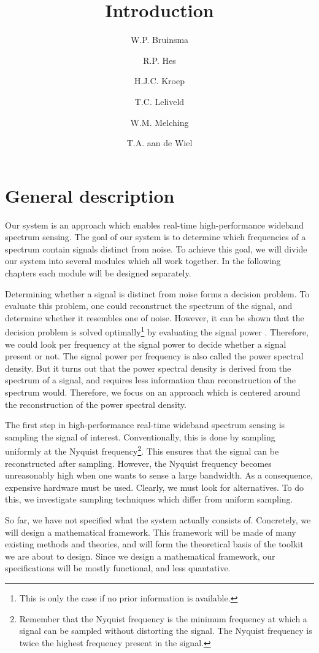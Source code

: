 \documentclass[a4paper, openany, oneside]{memoir}
\title{Introduction}
\author{W.P. Bruinsma \and R.P. Hes \and H.J.C. Kroep \and T.C. Leliveld \and W.M. Melching \and T.A. aan de Wiel}
\begin{document}
\section{General description}
Our system is an approach which enables real-time high-performance wideband spectrum sensing. The goal of our system is to determine which frequencies of a spectrum contain signals distinct from noise. To achieve this goal, we will divide our system into several modules which all work together. In the following chapters each module will be designed separately.

Determining whether a signal is distinct from noise forms a decision problem. To evaluate this problem, one could reconstruct the spectrum of the signal, and determine whether it resembles one of noise. However, it can be shown that the decision problem is solved optimally\footnote{This is only the case if no prior information is available.} by evaluating the signal power \cite{axell2012spectrum}. Therefore, we could look per frequency at the signal power to decide whether a signal present or not. The signal power per frequency is also called the power spectral density. But it turns out that the power spectral density is derived from the spectrum of a signal, and requires less information than reconstruction of the spectrum would. Therefore, we focus on an approach which is centered around the reconstruction of the power spectral density.

The first step in high-performance real-time wideband spectrum sensing is sampling the signal of interest. Conventionally, this is done by sampling uniformly at the Nyquist frequency\footnote{Remember that the Nyquist frequency is the minimum frequency at which a signal can be sampled without distorting the signal. The Nyquist frequency is twice the highest frequency present in the signal.}. This ensures that the signal can be reconstructed after sampling. However, the Nyquist frequency becomes unreasonably high when one wants to sense a large bandwidth. As a consequence, expensive hardware must be used. Clearly, we must look for alternatives. To do this, we investigate sampling techniques which differ from uniform sampling.

So far, we have not specified what the system actually consists of. Concretely, we will design a mathematical framework. This framework will be made of many existing methods and theories, and will form the theoretical basis of the toolkit we are about to design. Since we design a mathematical framework, our specifications will be mostly functional, and less quantative. 
\end{document}
